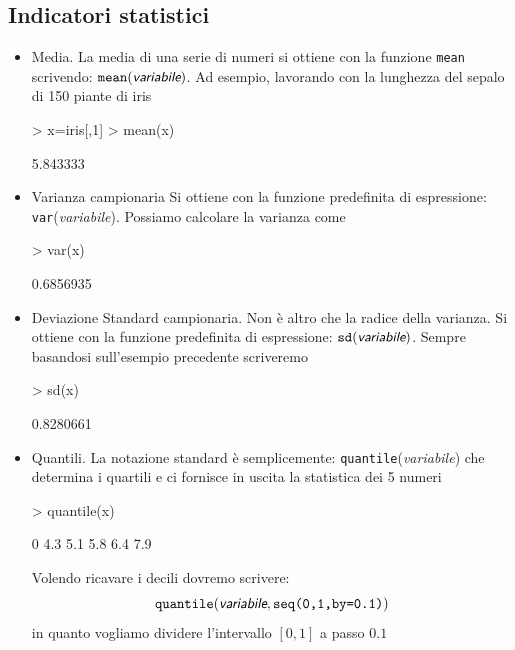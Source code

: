 \documentclass[onecolumn,12pt]{book}
\newcommand{\varia}[1]{\textsl{\textsf{#1}}}
\begin{document}
\subsection{Indicatori statistici}
\begin{itemize}
\item{}Media.\vskip0pt
La media di una serie di numeri si ottiene con la funzione \texttt{mean} scrivendo:
$\texttt{mean}(\varia{variabile})$.
Ad esempio, lavorando con la lunghezza del sepalo di 150 piante di iris
\begin{Schunk}
\begin{Sinput}
> x=iris[,1]
> mean(x)
\end{Sinput}
\begin{Soutput}
[1] 5.843333
\end{Soutput}
\end{Schunk}
\item{}Varianza campionaria\vskip0pt
Si ottiene con la funzione predefinita di espressione:
\texttt{var}(\varia{variabile}).
Possiamo calcolare la varianza come
\begin{Schunk}
\begin{Sinput}
> var(x)
\end{Sinput}
\begin{Soutput}
[1] 0.6856935
\end{Soutput}
\end{Schunk}
\item{}Deviazione Standard campionaria.\vskip0pt
Non \`e altro che la radice della varianza. Si ottiene con la funzione predefinita di espressione:
$\texttt{sd}(\varia{variabile})$.
Sempre basandosi sull'esempio precedente scriveremo
\begin{Schunk}
\begin{Sinput}
> sd(x)
\end{Sinput}
\begin{Soutput}
[1] 0.8280661
\end{Soutput}
\end{Schunk}

\item{}Quantili. La notazione standard \`e semplicemente: \texttt{quantile}(\varia{variabile}) che determina i quartili e ci fornisce in uscita la statistica dei 5 numeri

\begin{Schunk}
\begin{Sinput}
> quantile(x)
\end{Sinput}
\begin{Soutput}
  0%
 4.3  5.1  5.8  6.4  7.9 
\end{Soutput}
\end{Schunk}
Volendo ricavare i decili dovremo scrivere:
$$\texttt{quantile}(\varia{variabile},\texttt{seq(0,1,by=0.1)})$$
in quanto vogliamo dividere l'intervallo $[0,1]$ a passo $0.1$


\end{itemize}
\end{document}
